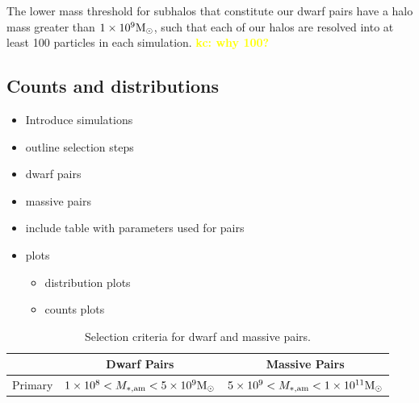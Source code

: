 \documentclass[twocolumn]{aastex631}
\newcommand{\kc}[1]{\textcolor{yellow}{\textbf{kc: #1}} }
\begin{document}
The lower mass threshold for subhalos that constitute our dwarf pairs have a halo mass greater than $1\times10^9\mathrm{M}_\odot$, such that each of our halos are resolved into at least 100 particles in each simulation.  
\kc{why 100?} 

\subsection{Counts and distributions}\label{sec:methods-counts}

\begin{itemize}
  \item Introduce simulations
  \item outline selection steps
  \item dwarf pairs
  \item massive pairs
  \item include table with parameters used for pairs
  \item plots
    \begin{itemize}
      \item distribution plots
      \item counts plots
    \end{itemize}
\end{itemize}


\begin{table}[htb]
  \centering
    \begin{tabular}{lcc}
     & Dwarf Pairs & Massive Pairs \\\hline\hline
    Primary &$1\times10^{8} < M_{*,\mathrm{am}} < 5\times10^{9} \mathrm{M}_\odot$ & $5\times10^{9} < M_{*,\mathrm{am}} < 1\times10^{11} \mathrm{M}_\odot$\\\hline
    \end{tabular}
    \caption{\label{table:mass}Selection criteria for dwarf and massive pairs.}
    \end{table}
\end{document}
